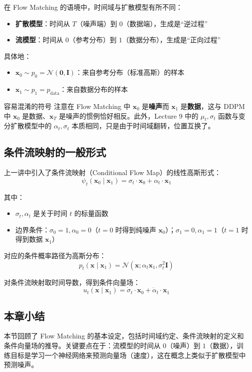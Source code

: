 在 Flow Matching 的语境中，时间域与扩散模型有所不同：

\begin{itemize}
    \item \textbf{扩散模型}：时间从 $T$（噪声端）到 $0$（数据端），生成是``逆过程''
    \item \textbf{流模型}：时间从 $0$（参考分布）到 $1$（数据分布），生成是``正向过程''
\end{itemize}

具体地：
\begin{itemize}
    \item $\mathbf{x}_0 \sim p_0 = \mathcal{N}(\mathbf{0}, \mathbf{I})$：来自参考分布（标准高斯）的样本
    \item $\mathbf{x}_1 \sim p_1 = p_{\text{data}}$：来自数据分布的样本
\end{itemize}

\begin{warningbox}{容易混淆的符号}
注意在 Flow Matching 中 $\mathbf{x}_0$ 是\textbf{噪声}而 $\mathbf{x}_1$ 是\textbf{数据}，这与 DDPM 中 $\mathbf{x}_0$ 是数据、$\mathbf{x}_T$ 是噪声的惯例恰好相反。此外，Lecture 9 中的 $\mu_t, \sigma_t$ 函数与变分扩散模型中的 $\alpha_t, \sigma_t$ 本质相同，只是由于时间域翻转，位置互换了。
\end{warningbox}

\subsection{条件流映射的一般形式}

上一讲中引入了条件流映射（Conditional Flow Map）的线性高斯形式：
$$\psi_t(\mathbf{x}_0 \mid \mathbf{x}_1) = \sigma_t \cdot \mathbf{x}_0 + \alpha_t \cdot \mathbf{x}_1$$

其中：
\begin{itemize}
    \item $\sigma_t, \alpha_t$ 是关于时间 $t$ 的标量函数
    \item 边界条件：$\sigma_0 = 1, \alpha_0 = 0$（$t=0$ 时得到纯噪声 $\mathbf{x}_0$）；$\sigma_1 = 0, \alpha_1 = 1$（$t=1$ 时得到数据 $\mathbf{x}_1$）
\end{itemize}

对应的条件概率路径为高斯分布：
$$p_t(\mathbf{x} \mid \mathbf{x}_1) = \mathcal{N}(\mathbf{x}; \alpha_t \mathbf{x}_1, \sigma_t^2 \mathbf{I})$$

对条件流映射取时间导数，得到条件向量场：
$$u_t(\mathbf{x} \mid \mathbf{x}_1) = \dot{\sigma}_t \cdot \mathbf{x}_0 + \dot{\alpha}_t \cdot \mathbf{x}_1$$

\subsection{本章小结}

本节回顾了 Flow Matching 的基本设定，包括时间域约定、条件流映射的定义和条件向量场的推导。关键要点在于：流模型的时间从 $0$（噪声）到 $1$（数据），训练目标是学习一个神经网络来预测向量场（速度），这在概念上类似于扩散模型中预测噪声。


